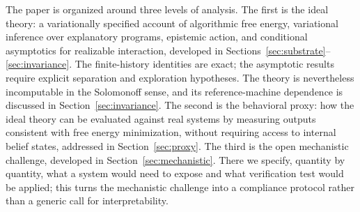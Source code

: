 \documentclass[11pt]{article}
\theoremstyle{remark}
\begin{document}
The paper is organized around three levels of analysis. The first is the ideal theory: a variationally specified account of algorithmic free energy, variational inference over explanatory programs, epistemic action, and conditional asymptotics for realizable interaction, developed in Sections~\ref{sec:substrate}--\ref{sec:invariance}. The finite-history identities are exact; the asymptotic results require explicit separation and exploration hypotheses. The theory is nevertheless incomputable in the Solomonoff sense, and its reference-machine dependence is discussed in Section~\ref{sec:invariance}. The second is the behavioral proxy: how the ideal theory can be evaluated against real systems by measuring outputs consistent with free energy minimization, without requiring access to internal belief states, addressed in Section~\ref{sec:proxy}. The third is the open mechanistic challenge, developed in Section~\ref{sec:mechanistic}. There we specify, quantity by quantity, what a system would need to expose and what verification test would be applied; this turns the mechanistic challenge into a compliance protocol rather than a generic call for interpretability.
\end{document}
